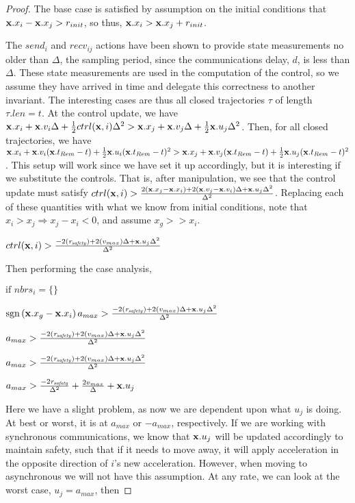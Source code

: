 \documentclass[10pt, conference, compsocconf]{IEEEtran}
\begin{document}
\begin{proof}
The base case is satisfied by assumption on the initial conditions that ${\bf x}.x_i - {\bf x}.x_j > r_{init}$, so thus, ${\bf x}.x_i > {\bf x}.x_j + r_{init}$.

The $send_i$ and $recv_{ij}$ actions have been shown to provide state measurements no older than $\Delta$, the sampling period, since the communications delay, $d$, is less than $\Delta$.  These state measurements are used in the computation of the control, so we assume they have arrived in time and delegate this correctness to another invariant.  The interesting cases are thus all closed trajectories $\tau$ of length $\tau.len = t$.  At the control update, we have ${\bf x}.x_{i} + {\bf x}.v_{i}\Delta + \frac{1}{2}ctrl({\bf x}, i)\Delta^2 > {\bf x}.x_{j} + {\bf x}.v_{j}\Delta + \frac{1}{2}{\bf x}.u_j\Delta^2$.  Then, for all closed trajectories, we have 
${\bf x}.x_{i} + {\bf x}.v_{i}({\bf x}.t_{Rem} - t) + \frac{1}{2}{\bf x}.u_i({\bf x}.t_{Rem} - t)^2 > {\bf x}.x_{j} + {\bf x}.v_{j}({\bf x}.t_{Rem} - t) + \frac{1}{2}{\bf x}.u_j({\bf x}.t_{Rem} - t)^2$.  This setup will work since we have set it up accordingly, but it is interesting if we substitute the controls.  That is, after manipulation, we see that the control update must satisfy $ctrl({\bf x}, i) > \frac{2({\bf x}.x_{j} - {\bf x}.x_{i}) + 2({\bf x}.v_{j} - {\bf x}.v_{i})\Delta + {\bf x}.u_j\Delta^2}{\Delta^2}$.  Replacing each of these quantities with what we know from initial conditions, note that $x_i > x_j \Rightarrow x_j - x_i < 0$, and assume $x_g >> x_i$.

$ctrl({\bf x}, i) > \frac{-2(\mathit{r_{safety}}) + 2(v_{max})\Delta + {\bf x}.u_j\Delta^2}{\Delta^2}$

Then performing the case analysis,

$\textrm{if } \mathit{nbrs}_i = \{\}$

$\operatorname{sgn} \left( {\bf x}.x_g - {\bf x}.x_i \right)a_{max} > \frac{-2(\mathit{r_{safety}}) + 2(v_{max})\Delta + {\bf x}.u_j\Delta^2}{\Delta^2}$

$a_{max} > \frac{-2(\mathit{r_{safety}}) + 2(v_{max})\Delta + {\bf x}.u_j\Delta^2}{\Delta^2}$

$a_{max} > \frac{-2(\mathit{r_{safety}}) + 2(v_{max})\Delta + {\bf x}.u_j\Delta^2}{\Delta^2}$

$a_{max} > \frac{-2\mathit{r_{safety}}}{\Delta^2} + \frac{2v_{max}}{\Delta} + {\bf x}.u_j$

Here we have a slight problem, as now we are dependent upon what $u_j$ is doing.  At best or worst, it is at $a_{max}$ or $-a_{max}$, respectively.  If we are working with synchronous communications, we know that ${\bf x}.u_j$ will be updated accordingly to maintain safety, such that if it needs to move away, it will apply acceleration in the opposite direction of $i$'s new acceleration.  However, when moving to asynchronous we will not have this assumption.  At any rate, we can look at the worst case, $u_j = a_{max}$, then


\end{proof}
\end{document}
